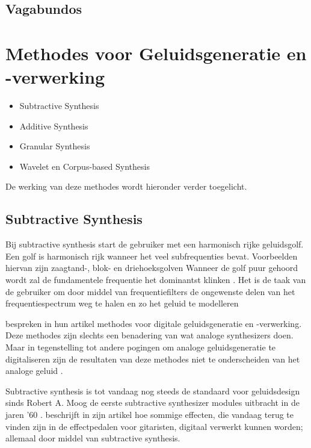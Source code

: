 \subsection{Vagabundos}

\section{Methodes voor Geluidsgeneratie en -verwerking}


\begin{itemize}
    \item Subtractive Synthesis
    \item Additive Synthesis
    \item Granular Synthesis
    \item Wavelet en Corpus-based Synthesis
\end{itemize}{}

De werking van deze methodes wordt hieronder verder toegelicht.

\subsection{Subtractive Synthesis}

Bij subtractive synthesis start de gebruiker met een harmonisch rijke geluidsgolf. Een golf is harmonisch rijk wanneer het veel subfrequenties bevat. Voorbeelden hiervan zijn zaagtand-, blok- en driehoeksgolven Wanneer de golf puur gehoord wordt zal de fundamentele frequentie het dominantst klinken \autocite{harmonics}. Het is de taak van de gebruiker om door middel van frequentiefilters de ongewenste delen van het frequentiespectrum weg te halen en zo het geluid te modelleren \autocite{subtractive}

\textcite{subtractive} bespreken in hun artikel methodes voor digitale geluidsgeneratie en -verwerking. Deze methodes zijn slechts een benadering van wat analoge synthesizers doen. Maar in tegenstelling tot andere pogingen om analoge geluidsgeneratie te digitaliseren zijn de resultaten van deze methodes niet te onderscheiden van het analoge geluid \autocite{subtractive}.

Subtractive synthesis is tot vandaag nog steeds de standaard voor geluidsdesign sinds Robert A. Moog de eerste subtractive synthesizer modules uitbracht in de jaren '60 \autocite{subtractive}. \textcite{guitarpedals} beschrijft in zijn artikel hoe sommige effecten, die vandaag terug te vinden zijn in de effectpedalen voor gitaristen, digitaal verwerkt kunnen worden; allemaal door middel van subtractive synthesis.

